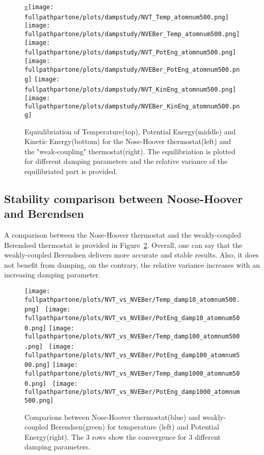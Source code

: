 \documentclass[10pt,a4paper]{report}
\def \fullpathpartone {/home/lukas/Desktop/project/independence/atomistic_modeling/exam/1_three-dimensional_atomic_system}
\begin{document}
\begin{center}
\begin{figure}[h]
g\texttt{[image: \\fullpathpartone/plots/dampstudy/NVT\_Temp\_atomnum500.png]}~
\texttt{[image: \\fullpathpartone/plots/dampstudy/NVEBer\_Temp\_atomnum500.png]}
\texttt{[image: \\fullpathpartone/plots/dampstudy/NVT\_PotEng\_atomnum500.png]}~
\texttt{[image: \\fullpathpartone/plots/dampstudy/NVEBer\_PotEng\_atomnum500.png]}
\texttt{[image: \\fullpathpartone/plots/dampstudy/NVT\_KinEng\_atomnum500.png]}~
\texttt{[image: \\fullpathpartone/plots/dampstudy/NVEBer\_KinEng\_atomnum500.png]}
\caption[aaa]{Equiulibriation of Temperature(top), Potential Energy(middle) and Kinetic Energy(bottom) for the Nose-Hoover thermostat(left) and the "weak-coupling" thermostat(right). The equilibriation is plotted for different damping parameters and the relative variance of the equilibriated part is provided.}
\label{fig:p1_equilibriation}
\end{figure}
\end{center}


\subsection{Stability comparison between Noose-Hoover and Berendsen}
A comparison between the Nose-Hoover thermostat and the weakly-coupled Berendsed thermostat is provided in Figure~\ref{fig:p1_NVT_vs_NVEBer}.
Overall, one can say that the weakly-coupled Berendsen delivers more accurate and stable results. Also, it does not benefit from damping, on the contrary, the relative variance increases with an increasing damping parameter.

\begin{center}
\begin{figure}[h]
\texttt{[image: \\fullpathpartone/plots/NVT\_vs\_NVEBer/Temp\_damp10\_atomnum500.png]}~
\texttt{[image: \\fullpathpartone/plots/NVT\_vs\_NVEBer/PotEng\_damp10\_atomnum500.png]}
\texttt{[image: \\fullpathpartone/plots/NVT\_vs\_NVEBer/Temp\_damp100\_atomnum500.png]}~
\texttt{[image: \\fullpathpartone/plots/NVT\_vs\_NVEBer/PotEng\_damp100\_atomnum500.png]}
\texttt{[image: \\fullpathpartone/plots/NVT\_vs\_NVEBer/Temp\_damp1000\_atomnum500.png]}~
\texttt{[image: \\fullpathpartone/plots/NVT\_vs\_NVEBer/PotEng\_damp1000\_atomnum500.png]}
\caption[aaa]{Comparions between Nose-Hoover thermostat(blue) and weakly-coupled Berendsen(green) for temperature (left) and Potential Energy(right). The 3 rows show the convergence for 3 different damping parameters.}
\label{fig:p1_NVT_vs_NVEBer}
\end{figure}
\end{center}
\end{document}
